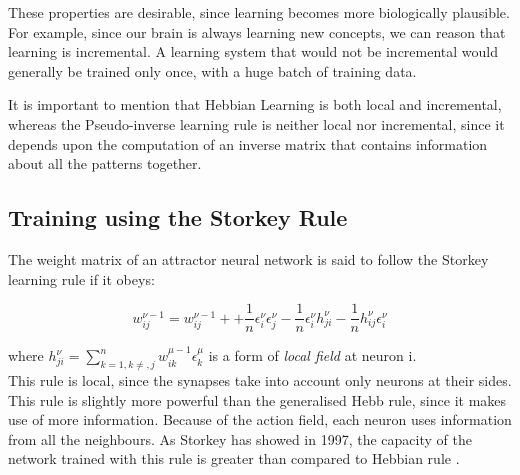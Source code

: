 These properties are desirable, since learning becomes more biologically plausible. For example, since our brain is always learning new concepts, we can reason that learning is incremental. A learning system that would not be incremental would generally be trained only once, with a huge batch of training data.

It is important to mention that Hebbian Learning is both local and incremental, whereas the Pseudo-inverse learning rule is neither local nor incremental, since it depends upon the computation of an inverse matrix that contains information about all the patterns together.

\subsection{Training using the Storkey Rule}

The weight matrix of an attractor neural network is said to follow the Storkey learning rule if it obeys:

\[ w_{ij}^{\nu-1} = w_{ij}^{\nu-1}+
		    +\frac{1}{n}\epsilon_{i}^{\nu} \epsilon_{j}^{\nu} 
		    -\frac{1}{n}\epsilon_{i}^{\nu} h_{ji}^{\nu}
		    -\frac{1}{n}h_{ij}^{\nu} \epsilon_{i}^{\nu}
		    \]

where \( h_{ji}^{\nu} = \sum_{k=1,k\neq,j}^{n} w_{ik}^{\mu-1}\epsilon_{k}^{\mu} \) is a form of \emph{local field} \cite{storkey1997increasing} at neuron i.\\ 
		    
This rule is local, since the synapses take into account only neurons at their sides. This rule is slightly more powerful than the generalised Hebb rule, since it makes use of more information. Because of the action field, each neuron uses information from all the neighbours. As Storkey has showed in 1997, the capacity of the network trained with this rule is greater than compared to Hebbian rule \cite{storkey1997increasing}.




